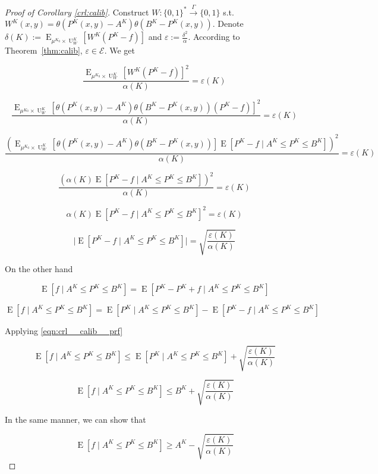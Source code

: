 \documentclass{article}
\numberwithin{equation}{section}
\theoremstyle{definition}
\theoremstyle{plain}
\newcommand{\Bool}{\{0,1\}}
\newcommand{\Words}{{\Bool^*}}
\DeclareMathOperator{\E}{E}
\DeclareMathOperator{\Un}{U}
\newcommand{\Abs}[1]{\lvert #1 \rvert}
\newcommand{\Fall}{\mathcal{E}}
\newcommand{\Scheme}{\xrightarrow{\Gamma}}
\begin{document}
\begin{proof}[Proof of Corollary \ref{crl:calib}]

Construct $W: \Words \Scheme \Bool$ s.t. ${W^{K}(x,y)=\theta(P^{K}(x,y)-A^{K})\theta(B^{K}-P^{K}(x,y))}$. Denote $\delta(K):=\E_{\mu^{K_0} \times \Un_W^{K}}[W^{K}(P^{K}-f)]$ and $\varepsilon:=\frac{\delta^2}{\alpha}$. According to Theorem~\ref{thm:calib}, $\varepsilon \in \Fall$.
We get

$$\frac{\E_{\mu^{K_0} \times \Un_W^{K}}[W^{K}(P^{K}-f)]^2}{\alpha(K)} = \varepsilon(K)$$

$$\frac{\E_{\mu^{K_0} \times \Un_W^{K}}[\theta(P^{K}(x,y)-A^{K})\theta(B^{K}-P^{K}(x,y))(P^{K}-f)]^2}{\alpha(K)} = \varepsilon(K)$$

$$\frac{(\E_{\mu^{K_0} \times \Un_W^{K}}[\theta(P^{K}(x,y)-A^{K})\theta(B^{K}-P^{K}(x,y))]\E[P^{K}-f \mid A^{K} \leq P^{K} \leq B^{K}])^2}{\alpha(K)} = \varepsilon(K)$$

$$\frac{(\alpha(K)\E[P^{K}-f \mid A^{K} \leq P^{K} \leq B^{K}])^2}{\alpha(K)} = \varepsilon(K)$$

$$\alpha(K)\E[P^{K}-f \mid A^{K} \leq P^{K} \leq B^{K}]^2 = \varepsilon(K)$$

\begin{equation}
\label{eqn:crl__calib__prf}
\Abs{\E[P^{K}-f \mid A^{K} \leq P^{K} \leq B^{K}]} = \sqrt{\frac{\varepsilon(K)}{\alpha(K)}}
\end{equation}

On the other hand

$$\E[f \mid A^{K} \leq P^{K} \leq B^{K}] = \E[P^{K}-P^{K}+f \mid A^{K} \leq P^{K} \leq B^{K}]$$

$$\E[f \mid A^{K} \leq P^{K} \leq B^{K}] = \E[P^{K} \mid A^{K} \leq P^{K} \leq B^{K}]-\E[P^{K}-f \mid A^{K} \leq P^{K} \leq B^{K}]$$

Applying \ref{eqn:crl__calib__prf}

$$\E[f \mid A^{K} \leq P^{K} \leq B^{K}] \leq \E[P^{K} \mid A^{K} \leq P^{K} \leq B^{K}]+\sqrt{\frac{\varepsilon(K)}{\alpha(K)}}$$


$$\E[f \mid A^{K} \leq P^{K} \leq B^{K}] \leq B^{K} + \sqrt{\frac{\varepsilon(K)}{\alpha(K)}}$$

In the same manner, we can show that

$$\E[f \mid A^{K} \leq P^{K} \leq B^{K}] \geq A^{K} - \sqrt{\frac{\varepsilon(K)}{\alpha(K)}}$$
\end{proof}
\end{document}
